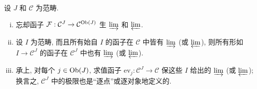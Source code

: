 \begin{proposition}\label{prop:forget-create}
	设 $J$ 和 $\mathcal{C}$ 为范畴.
	\begin{enumerate}[(i)]
		\item 忘却函子 $\mathcal{F}: \mathcal{C}^J \to \mathcal{C}^{\operatorname{Ob}(J)}$ 生 $\varinjlim$ 和 $\varprojlim$.
		\item 设 $I$ 为范畴, 而且所有始自 $I$ 的函子在 $\mathcal{C}$ 中皆有 $\varinjlim$ (或 $\varprojlim$), 则所有形如 $I \to \mathcal{C}^J$ 的函子在 $\mathcal{C}^J$ 中也有 $\varinjlim$ (或 $\varprojlim$).
		\item 承上, 对每个 $j \in \operatorname{Ob}(J)$, 求值函子 $\mathrm{ev}_j: \mathcal{C}^J \to \mathcal{C}$ 保这些 $I$ 给出的 $\varinjlim$ (或 $\varprojlim$); 换言之, $\mathcal{C}^J$ 中的极限也是``逐点''或逐对象地定义的.
	\end{enumerate}
\end{proposition}
